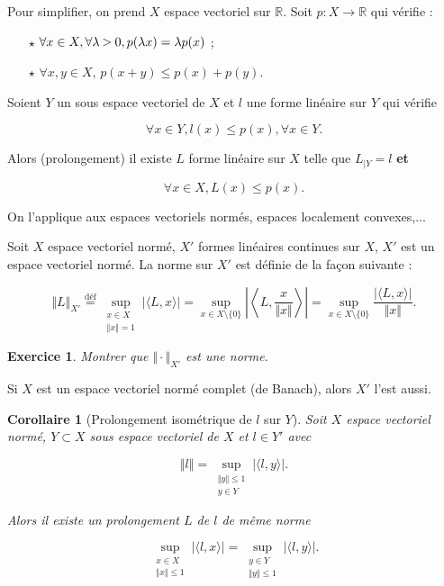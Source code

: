 \documentclass[french]{book}
\newtheorem*{corollary}{Corollaire}
\newtheorem{exo}{Exercice}
\newcommand{\biggg}{\rotatebox[origin=c]{90}{$\lor$}}
\newcommand{\bg}{\ \biggg\ }
\begin{document}
\begin{thm}
  Pour simplifier, on prend $X$ espace vectoriel sur $\mathbb{R}$. Soit $p : X \longrightarrow \mathbb{R}$ qui vérifie :
  \begin{itemize}
    \item [$\star$] $\forall x \in X, \forall \lambda \bg 0, p(\lambda x) = \lambda p(x)$ ;
    \item [$\star$] $\forall x, y \in X$, $p(x+y) \leq p(x) +p(y)$.
  \end{itemize}

  Soient $Y$ un sous espace vectoriel de $X$ et $l$ une forme linéaire sur $Y$ qui vérifie

  \[
  \forall x \in Y, l(x) \leq p(x), \forall x \in Y.
  \]

  Alors (prolongement) il existe $L$ forme linéaire sur $X$ telle que $L _{|Y} = l$ \textbf{et}

  \[
  \forall x \in X, L(x) \leq p(x).
  \]
\end{thm}

On l'applique aux espaces vectoriels normés, espaces localement convexes,...

\begin{thm}
  Soit $X$ espace vectoriel normé, $X'$ formes linéaires continues sur $X$, $X'$ est un espace vectoriel normé. La norme sur $X'$ est définie de la façon suivante :

  \[
  \Vert L \Vert _{X'} \stackrel{\text{déf}}{=} \sup_{ \substack{x \in X \\ \Vert x \Vert =1 } } \lvert \langle L,x \rangle  \rvert = \sup_{ x \in X \setminus \{ 0 \} } \left\lvert \left\langle L, \frac{x}{\Vert x \Vert } \right\rangle  \right\rvert = \sup_{ x \in X \setminus \{ 0 \} } \frac{\lvert \langle L,x \rangle  \rvert}{\Vert x \Vert }.
  \]

\end{thm}


\begin{exo}
  Montrer que $\Vert \cdot \Vert _{X'} $ est une norme.
\end{exo}

Si $X$ est un espace vectoriel normé complet (de Banach), alors $X'$ l'est aussi.

\begin{corollary}[Prolongement isométrique de $l$ sur $Y$]
  Soit $X$ espace vectoriel normé, $Y \subset X$ sous espace vectoriel de $X$ et $l \in Y'$ avec

  \[
  \Vert l \Vert = \sup_{ \substack{\Vert y \Vert \leq 1 \\ y \in Y} } \lvert \langle l,y \rangle  \rvert.
  \]

  Alors il existe un prolongement $L$ de $l$ de même norme

  \[
  \sup_{ \substack{x \in X \\ \Vert x \Vert \leq 1 } }  \lvert \langle l,x \rangle  \rvert = \sup_{ \substack{y \in Y \\ \Vert y \Vert \leq 1 } } \lvert \langle l,y \rangle  \rvert.
  \]
\end{corollary}
\end{document}
